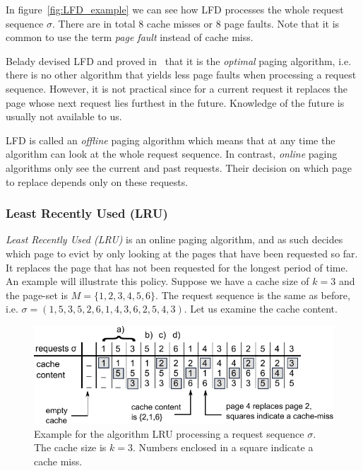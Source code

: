 \documentclass[a4paper,12pt, titlepage]{article}  %
\begin{document}
In figure~\ref{fig:LFD_example} we can see how LFD processes the whole request sequence $\sigma$. 
There are in total 8 cache misses or 8 page faults. Note that it is common to use the term 
\emph{page fault} instead of cache miss. 

Belady devised LFD and proved in~\cite{belady66_opt} that it is the \emph{optimal} paging algorithm, i.e. there is no other algorithm that yields 
less page faults when processing a request sequence. However, it is not practical since for a current 
request it replaces the page whose next request lies furthest in the future. Knowledge of the future
is usually not available to us.

LFD is called an \emph{offline} paging algorithm which means that at any time the algorithm
can look at the whole request sequence. In contrast, \emph{online} paging algorithms only 
see the current and past requests. Their decision on which page to replace depends only on these
requests.

\subsubsection{Least Recently Used (LRU)} 
\emph{Least Recently Used (LRU)} is an online paging algorithm, and as such
decides which page to evict by only looking at the pages that have been requested so far.
It replaces the page that has not been requested for the longest period of time. 
An example will illustrate this policy. Suppose we have a cache size of $k=3$ and the page-set is
$M=\{1,2,3,4,5,6\}$. The request sequence is the same as before, i.e.
 $\sigma = (1,5,3,5,2,6,1,4,3,6,2,5,4,3)$. Let us examine the cache content.

\begin{figure}[h]
	\centering
	\includegraphics{./figures/LRU_example.pdf}
	\caption{Example for the algorithm LRU processing a request sequence $\sigma$. 
	         The cache size is $k=3$. Numbers enclosed in a square indicate a cache miss.}
	\label{fig:LRU_example}
\end{figure}
\end{document}

